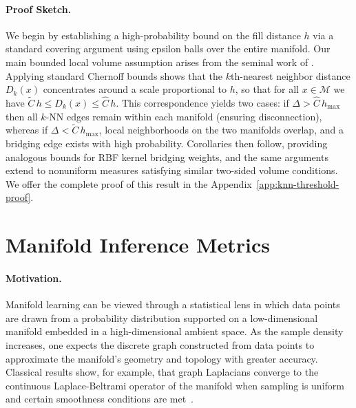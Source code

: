 \documentclass{article}
\theoremstyle{plain}
\theoremstyle{definition}
\theoremstyle{remark}
\begin{document}
\paragraph{Proof Sketch.} We begin by establishing a high-probability bound on the fill distance $h$ via a standard covering argument using epsilon balls over the entire manifold. Our main bounded local volume assumption arises from the seminal work of \citet{niyogiFindingHomologySubmanifolds2008a}.
Applying standard Chernoff bounds shows that the $k$th-nearest neighbor distance $D_k(x)$ concentrates around a scale proportional to $h$, so that for all $x\in\mathcal{M}$ we have $\widetilde{C}\,h\le D_k(x)\le \widehat{C}\,h$. This correspondence yields two cases: if $\Delta> \widehat{C}\,h_{\max}$ then all $k$-NN edges remain within each manifold (ensuring disconnection), whereas if $\Delta< \widetilde{C}\,h_{\max}$, local neighborhoods on the two manifolds overlap, and a bridging edge exists with high probability. Corollaries then follow, providing analogous bounds for RBF kernel bridging weights, and the same arguments extend to nonuniform measures satisfying similar two-sided volume conditions. We offer the complete proof of this result in the Appendix~\ref{app:knn-threshold-proof}. 


\section{Manifold Inference Metrics}

\paragraph{Motivation.}
Manifold learning can be viewed through a statistical lens in which data points are drawn from a probability distribution supported on a low-dimensional manifold embedded in a high-dimensional ambient space. As the sample density increases, one expects the discrete graph constructed from data points to approximate the manifold’s geometry and topology with greater accuracy. Classical results show, for example, that graph Laplacians converge to the continuous Laplace-Beltrami operator of the manifold when sampling is uniform and certain smoothness conditions are met~\citet{belkinConvergenceLaplacianEigenmaps2007, trillosErrorEstimatesSpectral2018}.
\end{document}
